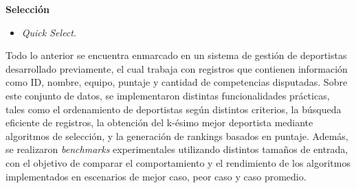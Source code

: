\textbf{Selección}

\begin{itemize}
    \item \textit{Quick Select}.
\end{itemize}

Todo lo anterior se encuentra enmarcado en un sistema de gestión de deportistas desarrollado previamente, el cual trabaja con registros que contienen información 
como ID, nombre, equipo, puntaje y cantidad de competencias disputadas.  Sobre este conjunto de datos, se implementaron distintas funcionalidades prácticas, 
tales como el ordenamiento de deportistas según distintos criterios, la búsqueda eficiente de registros, la obtención del k-ésimo mejor deportista mediante 
algoritmos de selección, y la generación de rankings basados en puntaje.  Además, se realizaron \textit{benchmarks} experimentales utilizando distintos tamaños 
de entrada, con el objetivo de comparar el comportamiento y el rendimiento de los algoritmos implementados en escenarios de mejor caso, peor caso y caso promedio.







